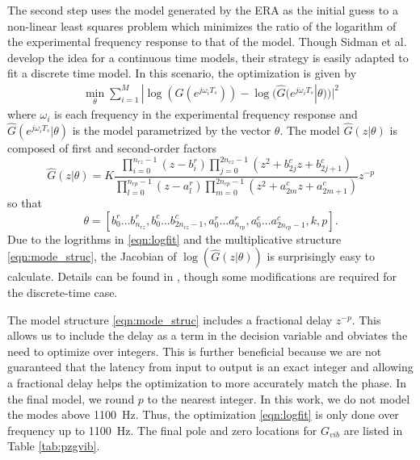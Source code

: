 \documentclass[journal,twocolumn,twoside]{IEEEtran}
\begin{document}
The second step uses the model generated by the ERA as the initial guess to a non-linear least squares problem \cite{sidman_parametric_1991} which minimizes the ratio of the logarithm of the experimental frequency response to that of the model. Though Sidman et al. develop the idea for a continuous time models, their strategy is easily adapted to fit a discrete time model. In this scenario, the optimization is given by
\begin{align}
\min_{\theta} \sum_{i=1}^M| \log(G(e^{j\omega_iT_s})) - \log(\hat{G}(e^{j\omega_iT_s}|\theta))|^2
\label{eqn:logfit}
\end{align}
where $\omega_i$ is each frequency in the experimental frequency response and $\hat{G}(e^{j\omega_iT_s}|\theta)$ is the model parametrized by the vector $\theta$. The model $\hat{G}(z|\theta)$ is composed of first and second-order factors
\begin{equation}
  \hat{G}(z|\theta) =K \frac{\prod_{i=0}^{n_{rz}-1} (z-b^r_i) \prod_{j=0}^{2n_{cz}-1}(z^2 +b^c_{2j}z + b^c_{2j+1})}
  { \prod_{l=0}^{n_{rp}-1}(z-a^r_l) \prod_{m=0}^{2n_{cp}-1}(z^2 +a^c_{2m}z + a^c_{2m+1})}z^{-p} \label{eqn:mode_struc}
\end{equation}
so that
\begin{equation}
\theta = [b^r_0\dots b^r_{n_{rz}}, b^c_{0}\dots b^c_{2n_{cz}-1}, a^r_0\dots a^r_{n_{rp}}, a^c_{0}\dots a^c_{2n_{cp}-1}, k, p].
\end{equation}
Due to the logrithms in \eqref{eqn:logfit} and the multiplicative structure \eqref{eqn:mode_struc}, the Jacobian of $\log(\hat{G}(z|\theta))$ is surprisingly easy to calculate. Details can be found in \cite{sidman_parametric_1991}, though some modifications are required for the discrete-time case.

The model structure \eqref{eqn:mode_struc} includes a fractional delay $z^{-p}$. This allows us to include the delay as a term in the decision variable and obviates the need to optimize over integers. This is further beneficial because we are not guaranteed that the latency from input to output is an exact integer and allowing a fractional delay helps the optimization to more accurately match the phase. In the final model, we round $p$ to the nearest integer. In this work, we do not model the modes above 1100~Hz. Thus, the optimization \eqref{eqn:logfit} is only done over frequency up to 1100~Hz. The final pole and zero locations for $G_{vib}$ are listed in Table \ref{tab:pzgvib}.
\end{document}
